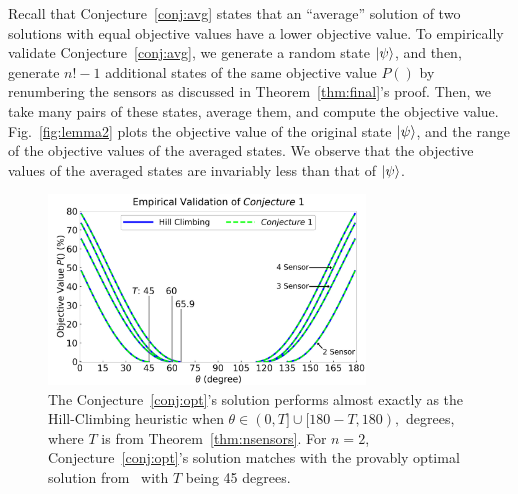 Recall that Conjecture~\ref{conj:avg} states that an ``average'' solution 
of two \iso solutions with
equal objective values have a lower objective value. To empirically validate
Conjecture~\ref{conj:avg}, we generate a random state $\ket{\psi}$, and then, 
generate  $n!-1$ additional states of the same objective value $P()$ by 
renumbering the sensors as discussed in Theorem~\ref{thm:final}'s proof. 
Then, we take many pairs of these states, average them, and compute the
objective value. 
Fig.~\ref{fig:lemma2} plots the objective value of the original state $\ket{\psi}$,
and the range of the objective values of the averaged states. We observe that the
objective values of the averaged states are invariably less than that of 
$\ket{\psi}$. 

\begin{figure}[ht]
    \centering
    \includegraphics[width=0.75\textwidth]{chapters/tqc/figures/conjecture.png}
    \caption{The Conjecture~\ref{conj:opt}'s solution performs almost exactly as the Hill-Climbing heuristic when $\theta \in (0, T] \cup [180-T, 180),$ degrees, where $T$ is from Theorem~\ref{thm:nsensors}. 
    For $n=2$, Conjecture~\ref{conj:opt}'s solution matches with the provably optimal solution from~\cite{PhysRevA.qsn} with $T$ being 45 degrees.}
    \label{fig:conjecture}
\end{figure}

